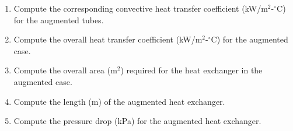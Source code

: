 \begin{fullwidth}
\begin{enumerate}[resume]
\vspace{1.0 cm}

\item Compute the corresponding convective heat transfer coefficient (kW/m$^2$-$^{\circ}$C) for the augmented tubes.

\vspace{1.0 cm}

\item Compute the overall heat transfer coefficient (kW/m$^2$-$^{\circ}$C) for the augmented case.

\vspace{1.0 cm}

\item Compute the overall area (m$^2$) required for the heat exchanger in the augmented case.

\vspace{1.0 cm}

\item Compute the length (m) of the augmented heat exchanger.

\vspace{1.0 cm}

\item Compute the pressure drop (kPa) for the augmented heat exchanger.


\end{enumerate}



\end{fullwidth}
